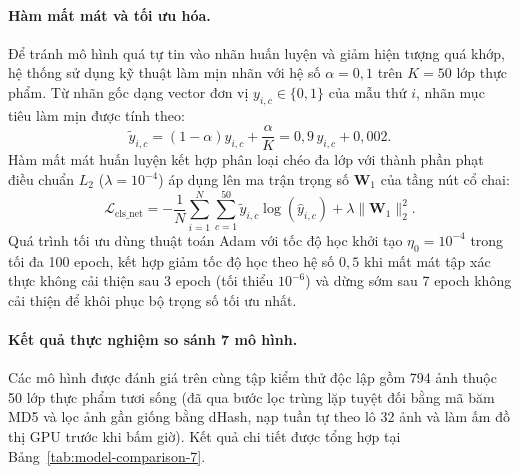 \paragraph{Hàm mất mát và tối ưu hóa.}
Để tránh mô hình quá tự tin vào nhãn huấn luyện và giảm hiện tượng quá khớp, hệ thống sử dụng kỹ thuật làm mịn nhãn với hệ số $\alpha = 0{,}1$ trên $K = 50$ lớp thực phẩm. Từ nhãn gốc dạng vector đơn vị $y_{i,c} \in \{0, 1\}$ của mẫu thứ $i$, nhãn mục tiêu làm mịn được tính theo:
\begin{equation}
    \tilde{y}_{i,c} = (1 - \alpha) y_{i,c} + \frac{\alpha}{K} = 0{,}9\,y_{i,c} + 0{,}002.
    \label{eq:label-smoothing}
\end{equation}
Hàm mất mát huấn luyện kết hợp phân loại chéo đa lớp với thành phần phạt điều chuẩn $L_2$ ($\lambda = 10^{-4}$) áp dụng lên ma trận trọng số $\mathbf{W}_1$ của tầng nút cổ chai:
\begin{equation}
    \mathcal{L}_{\mathrm{cls\_net}} = -\frac{1}{N} \sum_{i=1}^{N} \sum_{c=1}^{50} \tilde{y}_{i,c} \log(\hat{y}_{i,c}) + \lambda \|\mathbf{W}_1\|_2^2.
    \label{eq:cls-loss}
\end{equation}
Quá trình tối ưu dùng thuật toán Adam \cite{kingma2014adam} với tốc độ học khởi tạo $\eta_0 = 10^{-4}$ trong tối đa 100 epoch, kết hợp giảm tốc độ học theo hệ số $0{,}5$ khi mất mát tập xác thực không cải thiện sau 3 epoch (tối thiểu $10^{-6}$) và dừng sớm sau 7 epoch không cải thiện để khôi phục bộ trọng số tối ưu nhất.

\paragraph{Kết quả thực nghiệm so sánh 7 mô hình.}
Các mô hình được đánh giá trên cùng tập kiểm thử độc lập gồm 794 ảnh thuộc 50 lớp thực phẩm tươi sống (đã qua bước lọc trùng lặp tuyệt đối bằng mã băm MD5 và lọc ảnh gần giống bằng dHash, nạp tuần tự theo lô 32 ảnh và làm ấm đồ thị GPU trước khi bấm giờ). Kết quả chi tiết được tổng hợp tại Bảng~\ref{tab:model-comparison-7}.

